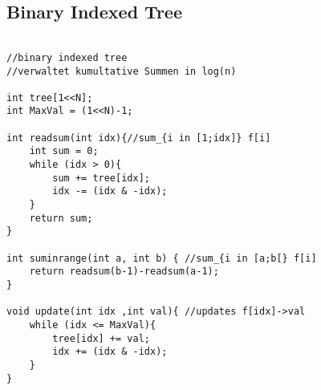 \subsection{Binary Indexed Tree}
\begin{lstlisting}
  
//binary indexed tree
//verwaltet kumultative Summen in log(n)

int tree[1<<N];
int MaxVal = (1<<N)-1;

int readsum(int idx){//sum_{i in [1;idx]} f[i]
	int sum = 0;
	while (idx > 0){
		sum += tree[idx];
		idx -= (idx & -idx);
	}
	return sum;
}

int suminrange(int a, int b) { //sum_{i in [a;b[} f[i]
	return readsum(b-1)-readsum(a-1);
}

void update(int idx ,int val){ //updates f[idx]->val
	while (idx <= MaxVal){
		tree[idx] += val;
		idx += (idx & -idx);
	}
}
\end{lstlisting}
